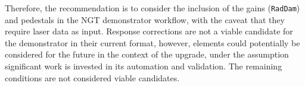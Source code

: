 Therefore, the recommendation is to consider the inclusion of the gains (\texttt{RadDam}) and pedestals in the NGT demonstrator workflow, with the caveat that they require laser data as input. Response corrections are not a viable candidate for the demonstrator in their current format, however, elements could potentially be considered for the future in the context of the \Phasetwo upgrade, under the assumption significant work is invested in its automation and validation. The remaining conditions are not considered viable candidates.



